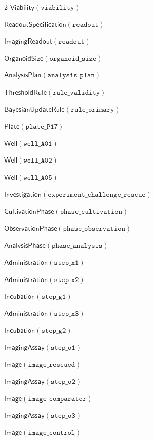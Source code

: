 \documentclass[10pt,a4paper]{article}
\begin{document}
{\begin{multicols}{2}
$\mathsf{Viability}(\mathtt{viability})$\par
$\mathsf{ReadoutSpecification}(\mathtt{readout})$\par
$\mathsf{ImagingReadout}(\mathtt{readout})$\par
$\mathsf{OrganoidSize}(\mathtt{organoid\_\allowbreak{}size})$\par
$\mathsf{AnalysisPlan}(\mathtt{analysis\_\allowbreak{}plan})$\par
$\mathsf{ThresholdRule}(\mathtt{rule\_\allowbreak{}validity})$\par
$\mathsf{BayesianUpdateRule}(\mathtt{rule\_\allowbreak{}primary})$\par
$\mathsf{Plate}(\mathtt{plate\_\allowbreak{}P17})$\par
$\mathsf{Well}(\mathtt{well\_\allowbreak{}A01})$\par
$\mathsf{Well}(\mathtt{well\_\allowbreak{}A02})$\par
$\mathsf{Well}(\mathtt{well\_\allowbreak{}A05})$\par
$\mathsf{Investigation}(\mathtt{experiment\_\allowbreak{}challenge\_\allowbreak{}rescue})$\par
$\mathsf{CultivationPhase}(\mathtt{phase\_\allowbreak{}cultivation})$\par
$\mathsf{ObservationPhase}(\mathtt{phase\_\allowbreak{}observation})$\par
$\mathsf{AnalysisPhase}(\mathtt{phase\_\allowbreak{}analysis})$\par
$\mathsf{Administration}(\mathtt{step\_\allowbreak{}x1})$\par
$\mathsf{Administration}(\mathtt{step\_\allowbreak{}x2})$\par
$\mathsf{Incubation}(\mathtt{step\_\allowbreak{}g1})$\par
$\mathsf{Administration}(\mathtt{step\_\allowbreak{}x3})$\par
$\mathsf{Incubation}(\mathtt{step\_\allowbreak{}g2})$\par
$\mathsf{ImagingAssay}(\mathtt{step\_\allowbreak{}o1})$\par
$\mathsf{Image}(\mathtt{image\_\allowbreak{}rescued})$\par
$\mathsf{ImagingAssay}(\mathtt{step\_\allowbreak{}o2})$\par
$\mathsf{Image}(\mathtt{image\_\allowbreak{}comparator})$\par
$\mathsf{ImagingAssay}(\mathtt{step\_\allowbreak{}o3})$\par
$\mathsf{Image}(\mathtt{image\_\allowbreak{}control})$\par

\end{multicols}}
\end{document}
